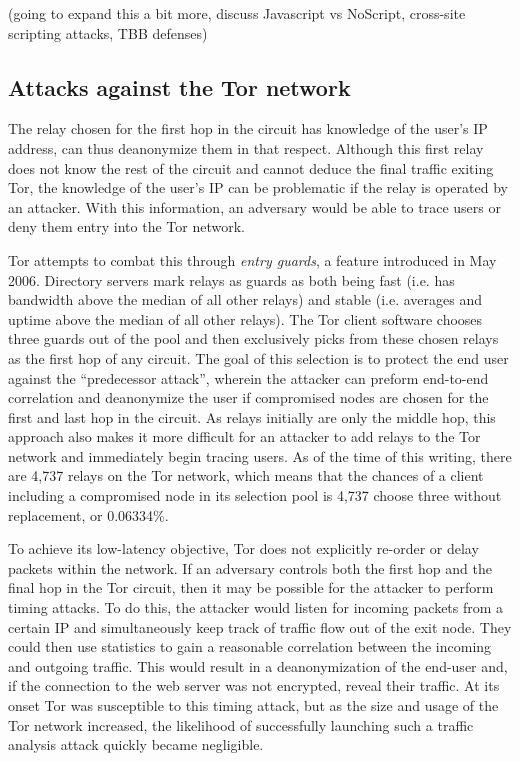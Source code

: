 \documentclass[journal]{IEEEtran}
\begin{document}
(going to expand this a bit more, discuss Javascript vs NoScript, cross-site scripting attacks, TBB defenses)

\subsection{Attacks against the Tor network}


The relay chosen for the first hop in the circuit has knowledge of the user's IP address, can thus deanonymize them in that respect. Although this first relay does not know the rest of the circuit and cannot deduce the final traffic exiting Tor, the knowledge of the user's IP can be problematic if the relay is operated by an attacker. With this information, an adversary would be able to trace users or deny them entry into the Tor network.

Tor attempts to combat this through \textit{entry guards}, a feature introduced in May 2006. Directory servers mark relays as guards as both being fast (i.e. has bandwidth above the median of all other relays) and stable (i.e. averages and uptime above the median of all other relays). The Tor client software chooses three guards out of the pool and then exclusively picks from these chosen relays as the first hop of any circuit.\cite{Xin2009} The goal of this selection is to protect the end user against the ``predecessor attack'', wherein the attacker can preform end-to-end correlation and deanonymize the user if compromised nodes are chosen for the first and last hop in the circuit.\cite{Wright2004} As relays initially are only the middle hop, this approach also makes it more difficult for an attacker to add relays to the Tor network and immediately begin tracing users. As of the time of this writing, there are 4,737 relays on the Tor network, which means that the chances of a client including a compromised node in its selection pool is 4,737 choose three without replacement, or 0.06334\%.

To achieve its low-latency objective, Tor does not explicitly re-order or delay packets within the network.\cite{McCoy2008} If an adversary controls both the first hop and the final hop in the Tor circuit, then it may be possible for the attacker to perform timing attacks. To do this, the attacker would listen for incoming packets from a certain IP and simultaneously keep track of traffic flow out of the exit node. They could then use statistics to gain a reasonable correlation between the incoming and outgoing traffic. This would result in a deanonymization of the end-user and, if the connection to the web server was not encrypted, reveal their traffic. At its onset Tor was susceptible to this timing attack, but as the size and usage of the Tor network increased, the likelihood of successfully launching such a traffic analysis attack quickly became negligible.\cite{Xin2009}
\end{document}
